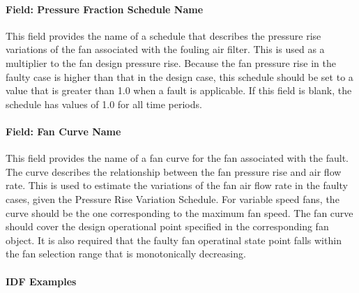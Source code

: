 \paragraph{Field: Pressure Fraction Schedule Name}\label{field-pressure-fraction-schedule-name}

This field provides the name of a schedule that describes the pressure rise variations of the fan associated with the fouling air filter. This is used as a multiplier to the fan design pressure rise. Because the fan pressure rise in the faulty case is higher than that in the design case, this schedule should be set to a value that is greater than 1.0 when a fault is applicable. If this field is blank, the schedule has values of 1.0 for all time periods.

\paragraph{Field: Fan Curve Name}\label{field-fan-curve-name}

This field provides the name of a fan curve for the fan associated with the fault. The curve describes the relationship between the fan pressure rise and air flow rate. This is used to estimate the variations of the fan air flow rate in the faulty cases, given the Pressure Rise Variation Schedule. For variable speed fans, the curve should be the one corresponding to the maximum fan speed. The fan curve should cover the design operational point specified in the corresponding fan object. It is also required that the faulty fan operatinal state point falls within the fan selection range that is monotonically decreasing.

\paragraph{IDF Examples}\label{an-example-of-idf-codes-for-the-fouling-air-filter-fault-models}

